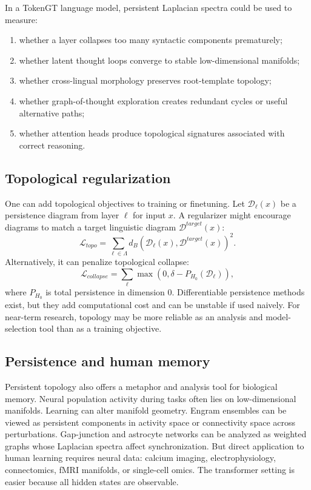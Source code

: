 \documentclass[11pt]{article}
\newcommand{\1}{\mathbf{1}}
\begin{document}
In a TokenGT language model, persistent Laplacian spectra could be used to measure:
\begin{enumerate}
\item whether a layer collapses too many syntactic components prematurely;
\item whether latent thought loops converge to stable low-dimensional manifolds;
\item whether cross-lingual morphology preserves root-template topology;
\item whether graph-of-thought exploration creates redundant cycles or useful alternative paths;
\item whether attention heads produce topological signatures associated with correct reasoning.
\end{enumerate}

\subsection{Topological regularization}

One can add topological objectives to training or finetuning. Let $\mathcal{D}_\ell(x)$ be a persistence diagram from layer $\ell$ for input $x$. A regularizer might encourage diagrams to match a target linguistic diagram $\mathcal{D}^{target}(x)$:
\[
\mathcal{L}_{topo}=\sum_{\ell\in\Lambda} d_B(\mathcal{D}_\ell(x),\mathcal{D}^{target}(x))^2.
\]
Alternatively, it can penalize topological collapse:
\[
\mathcal{L}_{collapse}=\sum_\ell \max(0,\delta-P_{H_0}(\mathcal{D}_\ell)),
\]
where $P_{H_0}$ is total persistence in dimension $0$. Differentiable persistence methods exist, but they add computational cost and can be unstable if used naively. For near-term research, topology may be more reliable as an analysis and model-selection tool than as a training objective.

\subsection{Persistence and human memory}

Persistent topology also offers a metaphor and analysis tool for biological memory. Neural population activity during tasks often lies on low-dimensional manifolds. Learning can alter manifold geometry. Engram ensembles can be viewed as persistent components in activity space or connectivity space across perturbations. Gap-junction and astrocyte networks can be analyzed as weighted graphs whose Laplacian spectra affect synchronization. But direct application to human learning requires neural data: calcium imaging, electrophysiology, connectomics, fMRI manifolds, or single-cell omics. The transformer setting is easier because all hidden states are observable.
\end{document}
